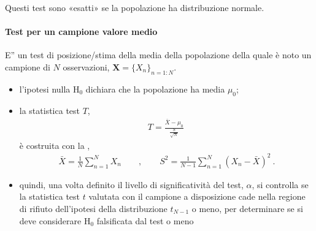 \documentclass[letterpaper,10pt,italian]{jupyterBook}
\begin{document}
\sphinxAtStartPar
Questi test sono «esatti» se la popolazione ha distribuzione normale.  


\paragraph{Test per un campione \sphinxhyphen{} valore medio}
\label{\detokenize{ch/statistics/hp-test-single:test-per-un-campione-valore-medio}}\label{\detokenize{ch/statistics/hp-test-single:hp-test-single-t-tests-single}}
\sphinxAtStartPar
E” un test di posizione/stima della media della popolazione della quale è noto un campione di \(N\) osservazioni, \(\mathbf{X} = \{ X_n \}_{n=1:N}\).
\begin{itemize}
\item {} 
\sphinxAtStartPar
l’ipotesi nulla \(\text{H}_0\) dichiara che la popolazione ha media \(\mu_0\);

\item {} 
\sphinxAtStartPar
la statistica test \(T\),
\begin{equation*}
\begin{split}T = \frac{\bar{X} - \mu_0}{\frac{S}{\sqrt{N}}} \ \end{split}
\end{equation*}
\sphinxAtStartPar
è costruita con la {\hyperref[\detokenize{ch/statistics/estimate:statistics-hs-inference-estimate-sample-estimators}]{}},
\begin{equation*}
\begin{split}\bar{X} = \frac{1}{N} \sum_{n=1}^N X_n \qquad , \qquad S^2 = \frac{1}{N-1} \sum_{n=1}^N (X_n - \bar{X})^2 \ .\end{split}
\end{equation*}
\end{itemize}


\begin{itemize}
\item {} 
\sphinxAtStartPar
quindi, una volta definito il livello di significatività del test, \(\alpha\), si controlla se la statistica test \(t\) valutata con il campione a disposizione cade nella regione di rifiuto dell’ipotesi della distribuzione \(t_{N-1}\) o meno, per determinare se si deve considerare \(\text{H}_0\) falsificata dal test o meno

\end{itemize}
\end{document}
